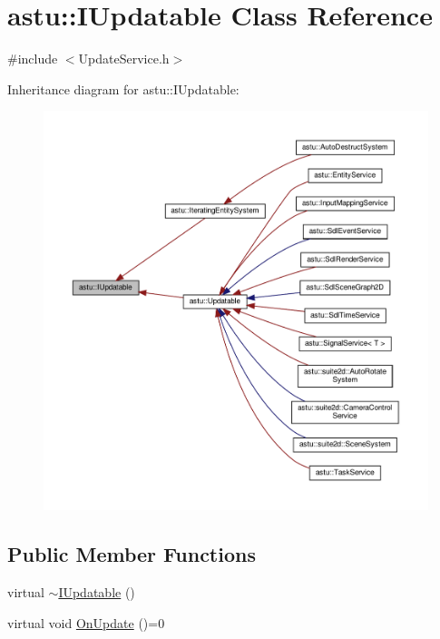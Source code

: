 \hypertarget{classastu_1_1IUpdatable}{}\section{astu\+:\+:I\+Updatable Class Reference}
\label{classastu_1_1IUpdatable}


{\ttfamily \#include $<$Update\+Service.\+h$>$}



Inheritance diagram for astu\+:\+:I\+Updatable\+:
\nopagebreak
\begin{figure}[H]
\begin{center}
\leavevmode
\includegraphics[width=350pt]{classastu_1_1IUpdatable__inherit__graph}
\end{center}
\end{figure}
\subsection*{Public Member Functions}
\begin{DoxyCompactItemize}
\item 
virtual \hyperlink{classastu_1_1IUpdatable_ae0ba3ec6b901ef3dd3692471222180e6}{$\sim$\+I\+Updatable} ()
\item 
virtual void \hyperlink{classastu_1_1IUpdatable_a76c7c6e2a71b725bbdbdf6808ef4743f}{On\+Update} ()=0
\end{DoxyCompactItemize}


